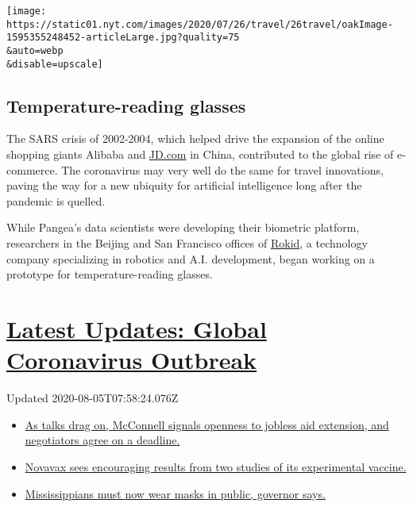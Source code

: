 \texttt{[image: https://static01.nyt.com/images/2020/07/26/travel/26travel/oakImage-1595355248452-articleLarge.jpg?quality=75\\\&auto=webp\\\&disable=upscale]}

\hypertarget{temperature-reading-glasses}{%
\subsection{Temperature-reading
glasses}\label{temperature-reading-glasses}}

The SARS crisis of 2002-2004, which helped drive the expansion of the
online shopping giants Alibaba and \href{http://JD.com}{JD.com} in
China, contributed to the global rise of e-commerce. The coronavirus may
very well do the same for travel innovations, paving the way for a new
ubiquity for artificial intelligence long after the pandemic is quelled.

While Pangea's data scientists were developing their biometric platform,
researchers in the Beijing and San Francisco offices of
\href{https://www.rokid.com/}{Rokid}, a technology company specializing
in robotics and A.I. development, began working on a prototype for
temperature-reading glasses.

\hypertarget{latest-updates-global-coronavirus-outbreak}{%
\section{\texorpdfstring{\href{https://www.nytimes.com/2020/08/04/world/coronavirus-cases.html?action=click\&pgtype=Article\&state=default\&region=MAIN_CONTENT_1\&context=storylines_live_updates}{Latest
Updates: Global Coronavirus
Outbreak}}{Latest Updates: Global Coronavirus Outbreak}}\label{latest-updates-global-coronavirus-outbreak}}

Updated 2020-08-05T07:58:24.076Z

\begin{itemize}
\tightlist
\item
  \href{https://www.nytimes.com/2020/08/04/world/coronavirus-cases.html?action=click\&pgtype=Article\&state=default\&region=MAIN_CONTENT_1\&context=storylines_live_updates\#link-762df92}{As
  talks drag on, McConnell signals openness to jobless aid extension,
  and negotiators agree on a deadline.}
\item
  \href{https://www.nytimes.com/2020/08/04/world/coronavirus-cases.html?action=click\&pgtype=Article\&state=default\&region=MAIN_CONTENT_1\&context=storylines_live_updates\#link-1228a480}{Novavax
  sees encouraging results from two studies of its experimental
  vaccine.}
\item
  \href{https://www.nytimes.com/2020/08/04/world/coronavirus-cases.html?action=click\&pgtype=Article\&state=default\&region=MAIN_CONTENT_1\&context=storylines_live_updates\#link-794484ed}{Mississippians
  must now wear masks in public, governor says.}
\end{itemize}

